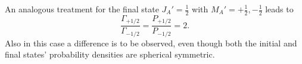 An analogous treatment for the final state
$J_A'=\frac 12$ with $M_A'= +\frac 12, -\frac 12$
leads to
\begin{equation}
  \frac{\Gamma_{+1/2}}{\Gamma_{-1/2}} = \frac{P_{+1/2}}{P_{-1/2}} = 2  .
\end{equation}
Also in this case a difference is to be observed, even though both the initial
and final states' probability densities are spherical symmetric.

